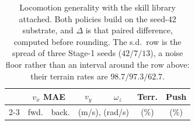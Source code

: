 \documentclass[letterpaper, 10 pt, conference]{ieeeconf}  %
\begin{document}
\begin{table}[htbp]
\centering
\caption{Locomotion generality with the skill library attached. Both policies
build on the seed-$42$ substrate, and $\Delta$ is that paired difference,
computed before rounding. The s.d.\ row is the spread of three Stage-1 seeds
($42/7/13$), a noise floor rather than an interval around the row above:
their terrain rates are $98.7/97.3/62.7$.}
\label{tab:loco}
\scriptsize
\setlength{\tabcolsep}{3pt}
\begin{tabular}{@{}lcccccc@{}}
\toprule
 & \multicolumn{2}{c}{$v_x$ MAE} & $v_y$ & $\omega_z$ & Terr. & Push \\
\cmidrule(lr){2-3}
 & fwd. & back. & \multicolumn{2}{c}{\tiny (m/s), (rad/s)} & (\%) & (\%) \\
\midrule

\end{tabular}
\end{table}
\end{document}
